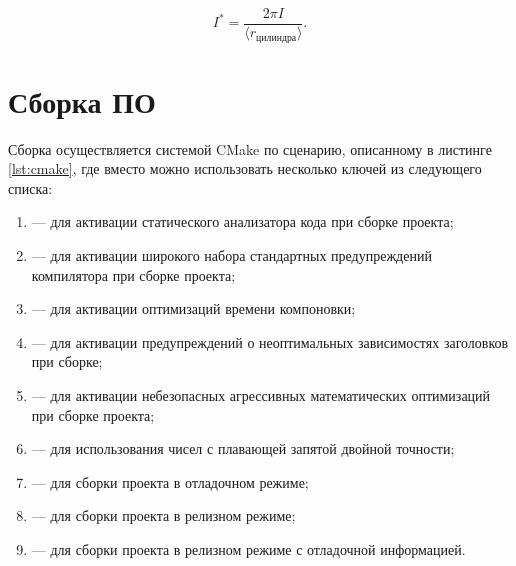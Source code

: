 \begin{equation}
	I^* = \frac{2\pi I}{\langle r_{\text{цилиндра}} \rangle}.
\end{equation}




\section{Сборка ПО}

Сборка осуществляется системой CMake по сценарию, описанному в листинге \ref{lst:cmake}, где вместо \code{[options...]} можно использовать несколько ключей из следующего списка:
\begin{enumerate}
	\item {} — для активации статического анализатора кода при сборке проекта;
	\item {} — для активации широкого набора стандартных предупреждений компилятора при сборке проекта;
	\item {} — для активации оптимизаций времени компоновки;
	\item {} — для активации предупреждений о неоптимальных зависимостях заголовков при сборке;
	\item {} — для активации небезопасных агрессивных математических оптимизаций при сборке проекта;
	\item {} — для использования чисел с плавающей запятой двойной точности;
	\item {} — для сборки проекта в отладочном режиме;
	\item {} — для сборки проекта в релизном режиме;
	\item {} — для сборки проекта в релизном режиме с отладочной информацией.
\end{enumerate}


